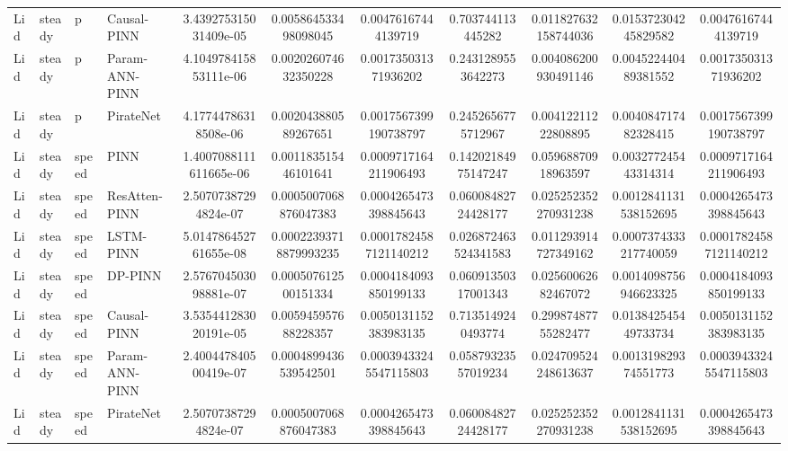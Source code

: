 \begin{landscape}
\begin{table}[p]
{\begin{tabular}{llllccccccc}
Lid & steady &     p &    Causal-PINN &  3.439275315031409e-05 &   0.005864533498098045 &    0.00476167444139719 &    0.703744113445282 &  0.011827632158744036 &  0.015372304245829582 &    0.00476167444139719 \\
Lid & steady &     p & Param-ANN-PINN &  4.104978415853111e-06 &   0.002026074632350228 &   0.001735031371936202 &   0.2431289553642273 &  0.004086200930491146 &  0.004522440489381552 &   0.001735031371936202 \\
Lid & steady &     p &      PirateNet &   4.17744786318508e-06 &   0.002043880589267651 &  0.0017567399190738797 &   0.2452656775712967 &   0.00412211222808895 &  0.004084717482328415 &  0.0017567399190738797 \\
Lid & steady & speed &           PINN & 1.4007088111611665e-06 &   0.001183515446101641 &  0.0009717164211906493 &  0.14202184975147247 &   0.05968870918963597 &  0.003277245443314314 &  0.0009717164211906493 \\
Lid & steady & speed &  ResAtten-PINN &   2.50707387294824e-07 &  0.0005007068876047383 &  0.0004265473398845643 &  0.06008482724428177 &  0.025252352270931238 & 0.0012841131538152695 &  0.0004265473398845643 \\
Lid & steady & speed &      LSTM-PINN &  5.014786452761655e-08 & 0.00022393718879993235 & 0.00017824587121140212 & 0.026872463524341583 &  0.011293914727349162 & 0.0007374333217740059 & 0.00017824587121140212 \\
Lid & steady & speed &        DP-PINN &  2.576704503098881e-07 &   0.000507612500151334 &  0.0004184093850199133 &  0.06091350317001343 &   0.02560062682467072 & 0.0014098756946623325 &  0.0004184093850199133 \\
Lid & steady & speed &    Causal-PINN &  3.535441283020191e-05 &   0.005945957688228357 &  0.0050131152383983135 &   0.7135149240493774 &   0.29987487755282477 &  0.013842545449733734 &  0.0050131152383983135 \\
Lid & steady & speed & Param-ANN-PINN &  2.400447840500419e-07 &  0.0004899436539542501 & 0.00039433245547115803 &  0.05879323557019234 &  0.024709524248613637 &  0.001319829374551773 & 0.00039433245547115803 \\
Lid & steady & speed &      PirateNet &   2.50707387294824e-07 &  0.0005007068876047383 &  0.0004265473398845643 &  0.06008482724428177 &  0.025252352270931238 & 0.0012841131538152695 &  0.0004265473398845643 \\
\bottomrule
\end{tabular}%
}
\end{table}
\end{landscape}

